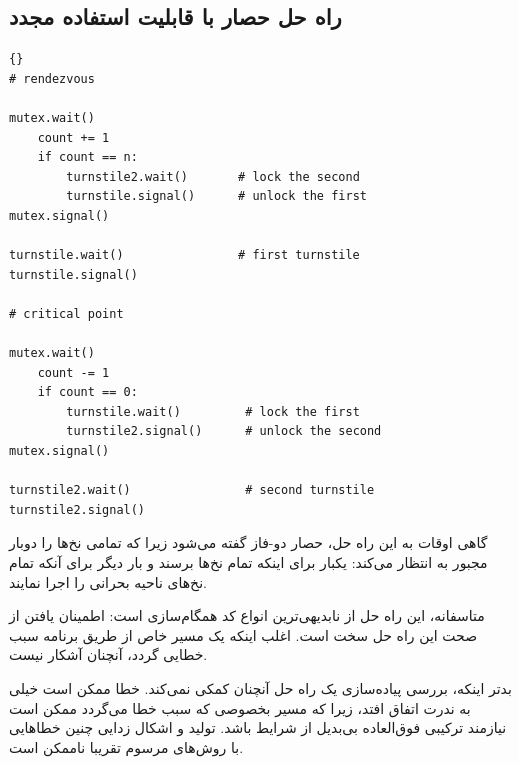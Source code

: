 \documentclass{book}
\begin{document}
\subsection {   راه حل حصار با قابلیت استفاده مجدد}


\begin{latin}
\begin{latin}
\begin{lstlisting}[title=\rl{ راهنمای حصار با قابلیت استفاده مجدد}]{} 
# rendezvous

mutex.wait()
    count += 1
    if count == n:
        turnstile2.wait()       # lock the second
        turnstile.signal()      # unlock the first
mutex.signal()

turnstile.wait()                # first turnstile
turnstile.signal()

# critical point

mutex.wait()
    count -= 1
    if count == 0: 
        turnstile.wait()         # lock the first
        turnstile2.signal()      # unlock the second
mutex.signal()

turnstile2.wait()                # second turnstile
turnstile2.signal()
\end{lstlisting}
\end{latin}
\end{latin}

    گاهی اوقات به این راه حل، حصار دو-فاز گفته می‌شود زیرا که تمامی نخ‌ها را دوبار مجبور به انتظار می‌کند: یکبار برای اینکه تمام نخ‌ها برسند و 
    بار دیگر برای آنکه تمام نخ‌های ناحیه بحرانی را اجرا نمایند. 

    متاسفانه، این راه حل  از نابدیهی‌ترین انواع کد همگام‌سازی است: اطمینان یافتن از صحت این راه حل سخت است. 
    اغلب اینکه یک مسیر خاص از طریق برنامه سبب خطایی گردد، آنچنان آشکار نیست.

    بدتر اینکه، بررسی پیاده‌سازی یک راه حل آنچنان کمکی نمی‌کند. خطا ممکن است خیلی به ندرت اتفاق افتد، 
    زیرا که مسیر بخصوصی که سبب خطا می‌گردد ممکن است نیازمند 
    ترکیبی فوق‌العاده بی‌بدیل از شرایط باشد. 
    تولید و اشکال زدایی چنین خطاهایی با روش‌های مرسوم تقریبا ناممکن است. 
    
\end{document}
